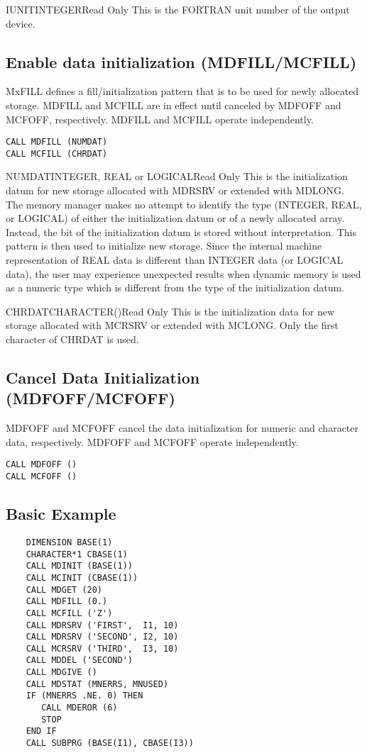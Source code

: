 \begin{argy}{IUNIT}{INTEGER}{Read Only}
This is the FORTRAN unit number of the output device. 
\end{argy}


\subsection{Enable data initialization (MDFILL/MCFILL)}
MxFILL defines a fill/initialization pattern that is to be used
for newly allocated storage. MDFILL and MCFILL are in effect until canceled
by MDFOFF and MCFOFF, respectively.  MDFILL and MCFILL operate
independently.
\begin{verbatim}
CALL MDFILL (NUMDAT)
CALL MCFILL (CHRDAT)
\end{verbatim}

\begin{argy}{NUMDAT}{INTEGER, REAL or LOGICAL}{Read Only}
This is the initialization datum for new storage al\-lo\-cat\-ed with MDRSRV
or extended with MDLONG. The memory manager makes no attempt to identify the
type (INTEGER, REAL, or LOGICAL) of either the initialization datum or of a
newly allocated array. Instead, the bit of the initialization datum is
stored without interpretation. This pattern is then used to initialize new
storage. Since the internal machine representation of REAL data is different
than INTEGER data (or LOGICAL data), the user may experience unexpected
results when dynamic memory is used as a numeric type which is different
from the type of the initialization datum. 
\end{argy}

\begin{argy}{CHRDAT}{CHARACTER\last(\last)}{Read Only}
This is the initialization data for new storage al\-lo\-cat\-ed with MCRSRV or
extended with MCLONG. Only the first character of CHRDAT is used.
\end{argy}

\subsection{Cancel Data Initialization (MDFOFF/MCFOFF)}
MDFOFF and MCFOFF cancel the data initialization for numeric and character
data, respectively.  MDFOFF and MCFOFF operate independently.
\begin{verbatim}
CALL MDFOFF ()
CALL MCFOFF ()
\end{verbatim}

\subsection{Basic Example}
\begin{verbatim}
    DIMENSION BASE(1)
    CHARACTER*1 CBASE(1)
    CALL MDINIT (BASE(1))
    CALL MCINIT (CBASE(1))
    CALL MDGET (20)
    CALL MDFILL (0.)
    CALL MCFILL ('Z')
    CALL MDRSRV ('FIRST',  I1, 10)
    CALL MDRSRV ('SECOND', I2, 10)
    CALL MCRSRV ('THIRD',  I3, 10)
    CALL MDDEL ('SECOND')
    CALL MDGIVE ()
    CALL MDSTAT (MNERRS, MNUSED)
    IF (MNERRS .NE. 0) THEN
       CALL MDEROR (6)
       STOP
    END IF
    CALL SUBPRG (BASE(I1), CBASE(I3))
\end{verbatim}

